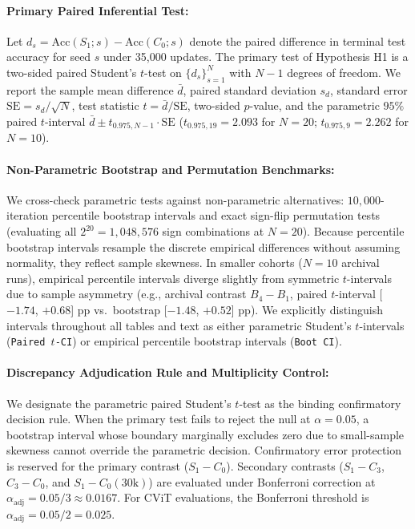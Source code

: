 \documentclass[sn-mathphys,Numbered]{sn-jnl}
\begin{document}
\paragraph{Primary Paired Inferential Test:}
Let $d_s = \mathrm{Acc}(S_1; s) - \mathrm{Acc}(C_0; s)$ denote the paired difference in terminal test accuracy for seed $s$ under 35,000 updates. The primary test of Hypothesis H1 is a two-sided paired Student's $t$-test on $\{d_s\}_{s=1}^N$ with $N-1$ degrees of freedom. We report the sample mean difference $\bar{d}$, paired standard deviation $s_d$, standard error $\mathrm{SE} = s_d / \sqrt{N}$, test statistic $t = \bar{d} / \mathrm{SE}$, two-sided $p$-value, and the parametric $95\%$ paired $t$-interval $\bar{d} \pm t_{0.975, N-1} \cdot \mathrm{SE}$ ($t_{0.975, 19} = 2.093$ for $N = 20$; $t_{0.975, 9} = 2.262$ for $N = 10$).

\paragraph{Non-Parametric Bootstrap and Permutation Benchmarks:}
We cross-check parametric tests against non-parametric alternatives: $10{,}000$-iteration percentile bootstrap intervals and exact sign-flip permutation tests (evaluating all $2^{20} = 1{,}048{,}576$ sign combinations at $N = 20$). Because percentile bootstrap intervals resample the discrete empirical differences without assuming normality, they reflect sample skewness. In smaller cohorts ($N = 10$ archival runs), empirical percentile intervals diverge slightly from symmetric $t$-intervals due to sample asymmetry (e.g., archival contrast $B_4 - B_1$, paired $t$-interval [$-1.74$, $+0.68$] pp vs.\ bootstrap [$-1.48$, $+0.52$] pp). We explicitly distinguish intervals throughout all tables and text as either parametric Student's $t$-intervals (\texttt{Paired $t$-CI}) or empirical percentile bootstrap intervals (\texttt{Boot CI}).

\paragraph{Discrepancy Adjudication Rule and Multiplicity Control:}
We designate the parametric paired Student's $t$-test as the binding confirmatory decision rule. When the primary test fails to reject the null at $\alpha = 0.05$, a bootstrap interval whose boundary marginally excludes zero due to small-sample skewness cannot override the parametric decision. Confirmatory error protection is reserved for the primary contrast ($S_1 - C_0$). Secondary contrasts ($S_1 - C_3$, $C_3 - C_0$, and $S_1 - C_0(30\mathrm{k})$) are evaluated under Bonferroni correction at $\alpha_{\mathrm{adj}} = 0.05 / 3 \approx 0.0167$. For CViT evaluations, the Bonferroni threshold is $\alpha_{\mathrm{adj}} = 0.05 / 2 = 0.025$.
\end{document}
